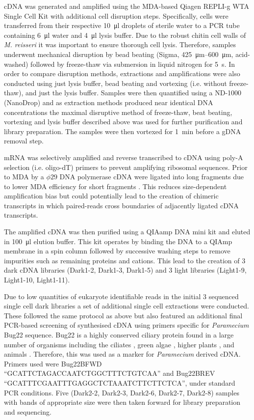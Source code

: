 cDNA was generated and amplified using the MDA-based Qiagen REPLI-g WTA Single Cell Kit \citep{Korfhage2015}
with additional cell disruption steps. 
Specifically, cells were transferred from their respective \SI{10}{\micro\litre} droplets of sterile water to
a PCR tube containing \SI{6}{\micro\litre} water and \SI{4}{\micro\litre} lysis buffer. 
Due to the robust chitin cell walls of \textit{M. reisseri} \citep{Kapaun1995} it was important to
ensure thorough cell lysis. Therefore, samples underwent mechanical disruption by bead beating (Sigma, \SIrange{425}{600}{\micro\metre}, 
acid-washed) followed by freeze-thaw via submersion in liquid nitrogen for \SI{5}{\second}.
In order to compare disruption methods, extractions and amplifications
were also conducted using just lysis buffer, bead beating and vortexing (i.e. without freeze-thaw), 
and just the lysis buffer.  Samples were then quantified using a ND-1000 (NanoDrop)
and as extraction methods produced near identical DNA concentrations 
the maximal disruptive method of freeze-thaw, beat beating, vortexing and lysis buffer
described above was used for further purification and library preparation.
The samples were then vortexed for \SI{1}{\minute} before a gDNA removal step.

mRNA was selectively amplified and reverse transcribed to cDNA using poly-A selection (i.e. oligo-dT) primers
to prevent amplifying ribosomal sequences. Prior to MDA by a \(\phi29\) DNA polymerase
cDNA were ligated into long fragments due to lower MDA efficiency for short fragments \citep{Korfhage2015}.
This reduces size-dependent amplification bias but could potentially lead to the creation
of chimeric transcripts in which paired-reads cross boundaries of adjacently ligated
cDNA transcripts.  

The amplified cDNA was then purified using a QIAamp DNA mini kit and eluted in \SI{100}{\micro\litre} elution buffer.
This kit operates by binding the DNA to a QIAmp membrane in a spin column followed by successive washing steps
to remove impurities such as remaining proteins and cations. This lead to the creation of 3 dark cDNA 
libraries (Dark1-2, Dark1-3, Dark1-5) and 3 light libraries (Light1-9, Light1-10, Light1-11).


Due to low quantities of eukaryote identifiable reads in the initial 3 sequenced single cell
dark libraries a set of additional single cell extractions were conducted. 
These followed the same protocol as above but also featured an additional
final PCR-based screening of synthesised cDNA using primers specific for \textit{Paramecium}
Bug22 sequence. Bug22 is a highly conserved ciliary protein found in a large number of organisms
including the ciliates \citep{Smith2005,Laligne2010}, green algae \citep{Keller2005,Laligne2010,Meng2014}, higher plants \citep{Hodges2011}, and animals \citep{MendesMaia2014}.
Therefore, this was used as a marker for \textit{Paramecium} derived cDNA.
Primers used were Bug22BFWD ``GCATTCTAGACCAATCTGGCTTTCTGTCAA'' and Bug22BREV ``GCATTTCGAATTTGAGGCTCTAAATCTTCTTCTCA'',
under standard PCR conditions.  Five (Dark2-2, Dark2-3, Dark2-6, Dark2-7, Dark2-8) samples with 
bands of appropriate size were then taken forward for library preparation and sequencing.


